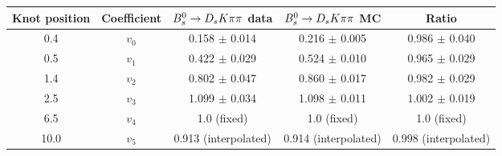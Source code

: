 \begin{tabular}{c c c c c}
\hline
\hline
Knot position & Coefficient & ${{B}^0_{s}}\rightarrow{\ensuremath{{D}_{s}}}{\ensuremath{K}}{\ensuremath{\pi}}{\ensuremath{\pi}}$ data & ${{B}^0_{s}}\rightarrow{\ensuremath{{D}_{s}}}{\ensuremath{K}}{\ensuremath{\pi}}{\ensuremath{\pi}}$ MC & Ratio \\
\hline
0.4 & $v_{0}$ & 0.158 $\pm$ 0.014 & 0.216 $\pm$ 0.005 & 0.986 $\pm$ 0.040\\
0.5 & $v_{1}$ & 0.422 $\pm$ 0.029 & 0.524 $\pm$ 0.010 & 0.965 $\pm$ 0.029\\
1.4 & $v_{2}$ & 0.802 $\pm$ 0.047 & 0.860 $\pm$ 0.017 & 0.982 $\pm$ 0.029\\
2.5 & $v_{3}$ & 1.099 $\pm$ 0.034 & 1.098 $\pm$ 0.011 & 1.002 $\pm$ 0.019\\
6.5 & $v_{4}$ &  1.0 (fixed) & 1.0 (fixed) & 1.0 (fixed)\\
10.0 & $v_{5}$ & 0.913 (interpolated) & 0.914 (interpolated) & 0.998 (interpolated) \\
\hline
\hline
\end{tabular}
